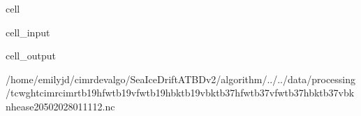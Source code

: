 \documentclass[letterpaper,10pt,english]{jupyterBook}
\begin{document}
\begin{sphinxuseclass}{cell}
\begin{sphinxVerbatimInput}
\begin{sphinxuseclass}{cell_input}
\end{sphinxuseclass}\end{sphinxVerbatimInput}
\begin{sphinxVerbatimOutput}

\begin{sphinxuseclass}{cell_output}
\begin{sphinxVerbatim}[commandchars=\\\{\}]
\PYGZsq{}/home/emilyjd/cimr\PYGZhy{}devalgo/SeaIceDrift\PYGZus{}ATBD\PYGZus{}v2/algorithm/../../data/processing/tc\PYGZus{}wght\PYGZus{}cimr\PYGZhy{}cimr\PYGZus{}tb19hfw\PYGZhy{}tb19vfw\PYGZhy{}tb19hbk\PYGZhy{}tb19vbk\PYGZhy{}tb37hfw\PYGZhy{}tb37vfw\PYGZhy{}tb37hbk\PYGZhy{}tb37vbk\PYGZus{}nh\PYGZhy{}ease2\PYGZhy{}050\PYGZus{}2028011112.nc\PYGZsq{}
\end{sphinxVerbatim}

\end{sphinxuseclass}\end{sphinxVerbatimOutput}

\end{sphinxuseclass}
\end{document}
